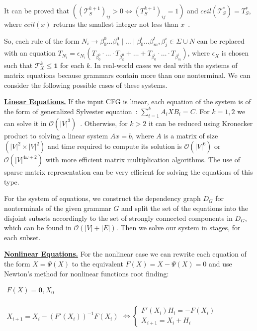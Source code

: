 \documentclass[sigconf]{acmart}
\begin{document}
It can be proved that $((\mathcal{T}_S^{k+1})_{ij} > 0 \iff (T_S^{k+1})_{ij} = 1)$ and $ceil(\mathcal{T}_S^*) = T_S^*$, where $ceil(x)$ returns the smallest integer not less than $x$~\cite{sato2017linear}.

So, each rule of the form $N_i \to \beta^0_0 \dots \beta^0_k \mid \ldots \mid \beta^l_0 \dots \beta^l_m, \beta^i_j \in \Sigma \cup N$ can be replaced with an equation 
$T_{N_i} = \epsilon_{N_i}(T_{\beta^0_0}\cdot \ldots \cdot T_{\beta^0_k} + \ldots + T_{\beta^l_0}\cdot \ldots \cdot T_{\beta^l_m}) $, where $\epsilon_X$ is chosen such that $\mathcal{T}_X^{k} \leq \textbf{1}$ for each $k$.
In real-world cases we deal with the systems of matrix equations because grammars contain more than one nonterminal. 
We can consider the following possible cases of these systems.

\underline{\textbf{Linear Equations.}}
If the input CFG is linear, each equation of the system is of the form of generalized Sylvester equation~\cite{!!!}: $\sum_{i = 1}^{k} A_iXB_i = C$.
For $k = 1, 2$ we can solve it in $\mathcal{O}(|V|^3)$~\cite{!!!}.
Otherwise, for $k > 2$ it can be reduced using Kronecker product to solving a linear system $Ax = b$, where $A$ is a matrix of size $(|V|^2 \times |V|^2)$ and time required to compute its solution is $\mathcal{O}(|V|^6)$ or $\mathcal{O}(|V|^{4\omega + 2})$ with more efficient matrix multiplication algorithms. 
The use of sparse matrix representation can be very efficient for solving the equations of this type.

For the system of equations, we construct the dependency graph $D_G$ for nonterminals of the given grammar $G$ and split the set of the equations into the disjoint subsets accordingly to the set of strongly connected components in $D_G$, which can be found in $\mathcal{O}(|V| + |E|)$.
Then we solve our system in stages, for each subset.

\underline{\textbf{Nonlinear Equations.}}
For the nonlinear case we can rewrite each equation of the form $X = \Psi(X)$ to the equivalent $F(X) = X - \Psi(X) = 0$ and use Newton's method for nonlinear functions root finding:

\begin{center}
\(
\left.
\begin{array}{c}
F(X) = \mathbf{0}, X_0 \\
\end{array} 
\right.
\)

\(
\left. 
\begin{array}{l}
X_{i+1} = X_i - (F'(X_i))^{-1}F(X_i) 
\end{array} 
\right.
\iff 
\left\{
\begin{array}{l}
F'(X_i)H_i = - F(X_i) \\
X_{i+1} = X_i + H_i
\end{array} 
\right.
\)
\end{center}
\end{document}
